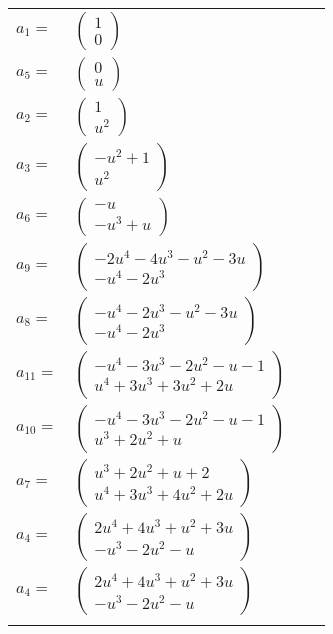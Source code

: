 \documentclass[1p]{elsarticle_modified}
\theoremstyle{definition}
\begin{document}
\begin{tabular}{m{7pt} m{180pt} m{7pt} m{180pt} }
\flushright $a_{1}=$&$\begin{pmatrix}1\\0\end{pmatrix}$ \\
\flushright $a_{5}=$&$\begin{pmatrix}0\\u\end{pmatrix}$ \\
\flushright $a_{2}=$&$\begin{pmatrix}1\\u^2\end{pmatrix}$ \\
\flushright $a_{3}=$&$\begin{pmatrix}- u^2+1\\u^2\end{pmatrix}$ \\
\flushright $a_{6}=$&$\begin{pmatrix}- u\\- u^3+u\end{pmatrix}$ \\
\flushright $a_{9}=$&$\begin{pmatrix}-2 u^4-4 u^3- u^2-3 u\\- u^4-2 u^3\end{pmatrix}$ \\
\flushright $a_{8}=$&$\begin{pmatrix}- u^4-2 u^3- u^2-3 u\\- u^4-2 u^3\end{pmatrix}$ \\
\flushright $a_{11}=$&$\begin{pmatrix}- u^4-3 u^3-2 u^2- u-1\\u^4+3 u^3+3 u^2+2 u\end{pmatrix}$ \\
\flushright $a_{10}=$&$\begin{pmatrix}- u^4-3 u^3-2 u^2- u-1\\u^3+2 u^2+u\end{pmatrix}$ \\
\flushright $a_{7}=$&$\begin{pmatrix}u^3+2 u^2+u+2\\u^4+3 u^3+4 u^2+2 u\end{pmatrix}$ \\
\flushright $a_{4}=$&$\begin{pmatrix}2 u^4+4 u^3+u^2+3 u\\- u^3-2 u^2- u\end{pmatrix}$\\ \flushright $a_{4}=$&$\begin{pmatrix}2 u^4+4 u^3+u^2+3 u\\- u^3-2 u^2- u\end{pmatrix}$\\&\end{tabular}
\end{document}
